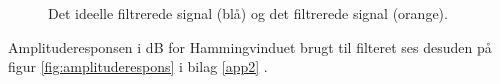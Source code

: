 \begin{figure}[H]
\begin{minipage}{0.49\textwidth}
\caption{Det ideelle filtrerede signal (blå) og det filtrerede signal (orange).}
\label{fig:resultat_signal}
\end{minipage}
\end{figure}

Amplituderesponsen i dB for Hammingvinduet brugt til filteret ses desuden på figur \ref{fig:amplituderespons} i bilag \ref{app2} .